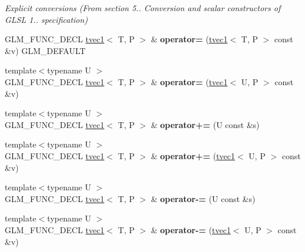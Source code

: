 \begin{DoxyCompactItemize}
\begin{DoxyCompactList}\small\item\em Explicit conversions (From section 5.. Conversion and scalar constructors of G\-L\-S\-L 1.. specification) \end{DoxyCompactList}\item 
\hypertarget{structglm_1_1tvec1_aa8b10ef7b33308cc9b26e447d8f5f1f3}{G\-L\-M\-\_\-\-F\-U\-N\-C\-\_\-\-D\-E\-C\-L \hyperlink{structglm_1_1tvec1}{tvec1}$<$ T, P $>$ \& {\bfseries operator=} (\hyperlink{structglm_1_1tvec1}{tvec1}$<$ T, P $>$ const \&v) G\-L\-M\-\_\-\-D\-E\-F\-A\-U\-L\-T}\label{structglm_1_1tvec1_aa8b10ef7b33308cc9b26e447d8f5f1f3}

\item 
\hypertarget{structglm_1_1tvec1_a472b0f4afb1f9efd1769597027a399f0}{{\footnotesize template$<$typename U $>$ }\\G\-L\-M\-\_\-\-F\-U\-N\-C\-\_\-\-D\-E\-C\-L \hyperlink{structglm_1_1tvec1}{tvec1}$<$ T, P $>$ \& {\bfseries operator=} (\hyperlink{structglm_1_1tvec1}{tvec1}$<$ U, P $>$ const \&v)}\label{structglm_1_1tvec1_a472b0f4afb1f9efd1769597027a399f0}

\item 
\hypertarget{structglm_1_1tvec1_adbaf282ba5770996e346d599f36fe61d}{{\footnotesize template$<$typename U $>$ }\\G\-L\-M\-\_\-\-F\-U\-N\-C\-\_\-\-D\-E\-C\-L \hyperlink{structglm_1_1tvec1}{tvec1}$<$ T, P $>$ \& {\bfseries operator+=} (U const \&s)}\label{structglm_1_1tvec1_adbaf282ba5770996e346d599f36fe61d}

\item 
\hypertarget{structglm_1_1tvec1_af0d6bb22d35f767a748be6fa086c4911}{{\footnotesize template$<$typename U $>$ }\\G\-L\-M\-\_\-\-F\-U\-N\-C\-\_\-\-D\-E\-C\-L \hyperlink{structglm_1_1tvec1}{tvec1}$<$ T, P $>$ \& {\bfseries operator+=} (\hyperlink{structglm_1_1tvec1}{tvec1}$<$ U, P $>$ const \&v)}\label{structglm_1_1tvec1_af0d6bb22d35f767a748be6fa086c4911}

\item 
\hypertarget{structglm_1_1tvec1_abf55a623f9a8fdbc5d6800c06b1ac491}{{\footnotesize template$<$typename U $>$ }\\G\-L\-M\-\_\-\-F\-U\-N\-C\-\_\-\-D\-E\-C\-L \hyperlink{structglm_1_1tvec1}{tvec1}$<$ T, P $>$ \& {\bfseries operator-\/=} (U const \&s)}\label{structglm_1_1tvec1_abf55a623f9a8fdbc5d6800c06b1ac491}

\item 
\hypertarget{structglm_1_1tvec1_ad2c5971147b89ac3a660d88296ec2a74}{{\footnotesize template$<$typename U $>$ }\\G\-L\-M\-\_\-\-F\-U\-N\-C\-\_\-\-D\-E\-C\-L \hyperlink{structglm_1_1tvec1}{tvec1}$<$ T, P $>$ \& {\bfseries operator-\/=} (\hyperlink{structglm_1_1tvec1}{tvec1}$<$ U, P $>$ const \&v)}\label{structglm_1_1tvec1_ad2c5971147b89ac3a660d88296ec2a74}


\end{DoxyCompactItemize}

